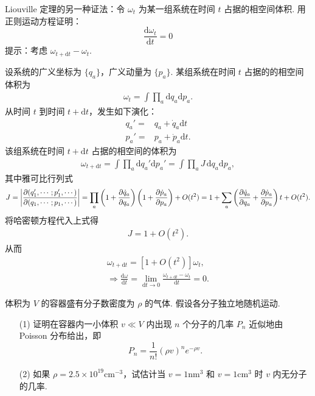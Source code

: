 \documentclass{assignment}
\begin{document}
\begin{prob}
    Liouville 定理的另一种证法：令 $\omega_t$ 为某一组系统在时间 $t$ 占据的相空间体积. 用正则运动方程证明：
    \[
        \frac{\mathrm{d}\omega_t}{\mathrm{d}t}=0
    \]
    提示：考虑 $\omega_{t+\mathrm{d}t}-\omega_t$.
\end{prob}
\begin{pf}
    设系统的广义坐标为 $\{q_a\}$，广义动量为 $\{p_a\}$. 某组系统在时间 $t$ 占据的的相空间体积为
    \begin{align}
        \omega_t=\int\prod_a\mathrm{d}q_a\mathrm{d}p_a.
    \end{align}
    从时间 $t$ 到时间 $t+\mathrm{d}t$，发生如下演化：
    \begin{align}
        q_a'=&q_a+\dot{q}_a\mathrm{d}t\\
        p_a'=&p_a+\dot{p}_a\mathrm{d}t.
    \end{align}
    该组系统在时间 $t+\mathrm{d}t$ 占据的相空间的体积为
    \begin{align}
        \omega_{t+\mathrm{d}t}=\int\prod_a\mathrm{d}q_a'\mathrm{d}p_a'=\int\prod_aJ\,\mathrm{d}q_a\mathrm{d}p_a,
    \end{align}
    其中雅可比行列式
    \begin{align}
        J=\left\lvert\frac{\partial(q_1',\cdots;p_1',\cdots)}{\partial(q_1,\cdots;p_1,\cdots)}\right\rvert=\prod_a\left(1+\frac{\partial\dot{q}_a}{\partial q_a}\right)\left(1+\frac{\partial\dot{p}_a}{\partial p_a}\right)+O(t^2)=1+\sum_a\left(\frac{\partial\dot{q}_a}{\partial q_a}+\frac{\partial\dot{p}_a}{\partial p_a}\right)t+O(t^2).
    \end{align}
    将哈密顿方程代入上式得
    \begin{align}
        J=1+O(t^2).
    \end{align}
    从而
    \begin{gather}
        \omega_{t+\mathrm{d}t}=[1+O(t^2)]\omega_t,\\
        \Longrightarrow\frac{\mathrm{d}\omega}{\mathrm{d}t}=\lim_{\mathrm{d}t\rightarrow 0}\frac{\omega_{t+\mathrm{d}t}-\omega_t}{\mathrm{d}t}=0.
    \end{gather}
\end{pf}

\begin{prob}
    体积为 $V$ 的容器盛有分子数密度为 $\rho$ 的气体. 假设各分子独立地随机运动.
    \begin{itemize}
        \item[(1)] 证明在容器内一小体积 $v\ll V$ 内出现 $n$ 个分子的几率 $P_n$ 近似地由 Poisson 分布给出，即
        \[
            P_n=\frac{1}{n!}(\rho v)^ne^{-\rho v}.
        \]
        \item[(2)] 如果 $\rho=2.5\times 10^{19}\text{cm}^{-3}$，试估计当 $v=1\text{nm}^3$ 和 $v=1\text{cm}^3$ 时 $v$ 内无分子的几率.
    \end{itemize}
\end{prob}
\begin{sol}
    
\end{sol}
\end{document}
